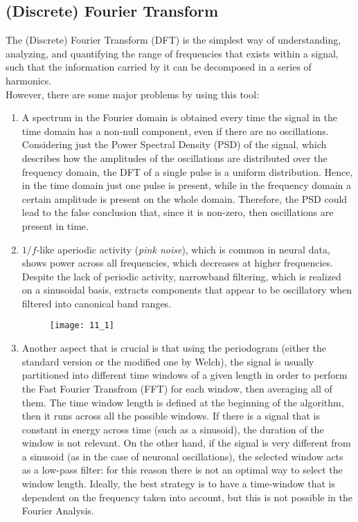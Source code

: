 \subsection{(Discrete) Fourier Transform}
The (Discrete) Fourier Transform (DFT) is the simplest way of understanding, analyzing, and
quantifying the range of frequencies that exists within a signal, such that the information
carried by it can be decomposed in a series of harmonics.\\
However, there are some major problems by using this tool:
\begin{enumerate}
    \item A spectrum in the Fourier domain is obtained every time the signal in the time domain
          has a non-null component, even if there are no oscillations. Considering just the Power
          Spectral Density (PSD) of the signal, which describes how the amplitudes of the
          oscillations are distributed over the frequency domain, the DFT of a single pulse is a
          uniform distribution. Hence, in the time domain just one pulse is present, while in the
          frequency domain a certain amplitude is present on the whole domain. Therefore, the PSD
          could lead to the false conclusion that, since it is non-zero, then oscillations are
          present in time.
    \item \(1/f\)-like aperiodic activity (\textit{pink noise}), which is common in neural data,
          shows power across all frequencies, which decreases at higher frequencies. Despite the lack
          of periodic activity, narrowband filtering, which is realized on a sinusoidal basis, extracts
          components that appear to be oscillatory when filtered into canonical band ranges.
          \begin{figure}[H]
              \texttt{[image: 11\_1]}
              \centering
          \end{figure}
    \item Another aspect that is crucial is that using the periodogram (either the standard version
          or the modified one by Welch), the signal is usually partitioned into different time windows of a
          given length in order to perform the Fast Fourier Transfrom (FFT) for each window, then averaging
          all of them. The time window length is defined at the beginning of the algorithm, then it runs across
          all the possible windows. If there is a signal that is constant in energy across time (such as a sinusoid),
          the duration of the window is not relevant. On the other hand, if the signal is very different from
          a sinusoid (as in the case of neuronal oscillations), the selected window acts as a low-pass filter:
          for this reason there is not an optimal way to select the window length. Ideally, the best strategy
          is to have a time-window that is dependent on the frequency taken into account, but this is not possible
          in the Fourier Analysis.
\end{enumerate}
